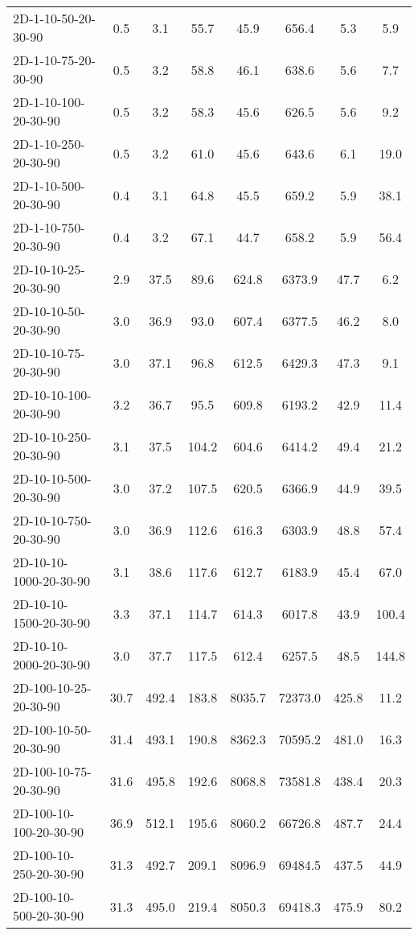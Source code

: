 \documentclass{article}
\begin{document}
\begin{center}
\begin{table}[h]
\begin{tabular}{|l||c|c|c|c|c|c|c|}
    2D-1-10-50-20-30-90 & 0.5 & 3.1 & 55.7 & 45.9 & 656.4 & 5.3 & 5.9 \\
    2D-1-10-75-20-30-90 & 0.5 & 3.2 & 58.8 & 46.1 & 638.6 & 5.6 & 7.7 \\
    2D-1-10-100-20-30-90 & 0.5 & 3.2 & 58.3 & 45.6 & 626.5 & 5.6 & 9.2 \\
    2D-1-10-250-20-30-90 & 0.5 & 3.2 & 61.0 & 45.6 & 643.6 & 6.1 & 19.0 \\
    2D-1-10-500-20-30-90 & 0.4 & 3.1 & 64.8 & 45.5 & 659.2 & 5.9 & 38.1 \\
    2D-1-10-750-20-30-90 & 0.4 & 3.2 & 67.1 & 44.7 & 658.2 & 5.9 & 56.4 \\
    \hline
    2D-10-10-25-20-30-90 & 2.9 & 37.5 & 89.6 & 624.8 & 6373.9 & 47.7 & 6.2 \\
    2D-10-10-50-20-30-90 & 3.0 & 36.9 & 93.0 & 607.4 & 6377.5 & 46.2 & 8.0 \\
    2D-10-10-75-20-30-90 & 3.0 & 37.1 & 96.8 & 612.5 & 6429.3 & 47.3 & 9.1 \\
    2D-10-10-100-20-30-90 & 3.2 & 36.7 & 95.5 & 609.8 & 6193.2 & 42.9 & 11.4 \\
    2D-10-10-250-20-30-90 & 3.1 & 37.5 & 104.2 & 604.6 & 6414.2 & 49.4 & 21.2 \\
    2D-10-10-500-20-30-90 & 3.0 & 37.2 & 107.5 & 620.5 & 6366.9 & 44.9 & 39.5 \\
    2D-10-10-750-20-30-90 & 3.0 & 36.9 & 112.6 & 616.3 & 6303.9 & 48.8 & 57.4 \\
    2D-10-10-1000-20-30-90 & 3.1 & 38.6 & 117.6 & 612.7 & 6183.9 & 45.4 & 67.0 \\
    2D-10-10-1500-20-30-90 & 3.3 & 37.1 & 114.7 & 614.3 & 6017.8 & 43.9 & 100.4 \\
    2D-10-10-2000-20-30-90 & 3.0 & 37.7 & 117.5 & 612.4 & 6257.5 & 48.5 & 144.8 \\
    \hline
    2D-100-10-25-20-30-90 & 30.7 & 492.4 & 183.8 & 8035.7 & 72373.0 & 425.8 & 11.2 \\
    2D-100-10-50-20-30-90 & 31.4 & 493.1 & 190.8 & 8362.3 & 70595.2 & 481.0 & 16.3 \\
    2D-100-10-75-20-30-90 & 31.6 & 495.8 & 192.6 & 8068.8 & 73581.8 & 438.4 & 20.3 \\
    2D-100-10-100-20-30-90 & 36.9 & 512.1 & 195.6 & 8060.2 & 66726.8 & 487.7 & 24.4 \\
    2D-100-10-250-20-30-90 & 31.3 & 492.7 & 209.1 & 8096.9 & 69484.5 & 437.5 & 44.9 \\
    2D-100-10-500-20-30-90 & 31.3 & 495.0 & 219.4 & 8050.3 & 69418.3 & 475.9 & 80.2 \\

\end{tabular}
\end{table}
\end{center}
\end{document}
